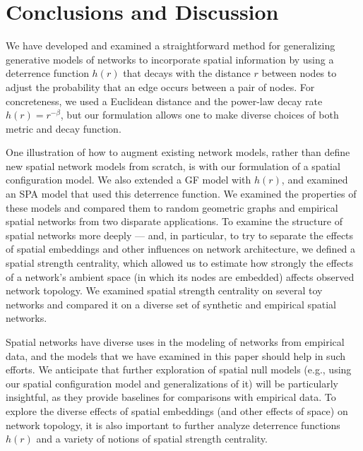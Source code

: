 \documentclass[%
 reprint,
 amsmath,amssymb,
 aps,
]{revtex4-1}
\begin{document}


\section{Conclusions and Discussion} \label{sec:discussion}

We have developed and examined a straightforward method for generalizing generative models of networks to incorporate spatial information by using a deterrence function $h(r)$ that decays with the distance $r$ between nodes to adjust the probability that an edge occurs between a pair of nodes. For concreteness, we used a Euclidean distance and the power-law decay rate $h(r) = r^{-\beta}$, but our formulation allows one to make diverse choices of both metric and decay function. 


One illustration of how to augment existing network models, rather than define new spatial network models from scratch, is with our formulation of a spatial configuration model. We also extended a GF model with $h(r)$, and examined an SPA model that used this deterrence function. 
We examined the properties of these models and compared them to random geometric graphs and empirical spatial networks from two disparate applications. To examine the structure of spatial networks more deeply --- and, in particular, to try to separate the effects of spatial embeddings and other influences on network architecture, we defined a spatial strength centrality, which allowed us to estimate how strongly the effects of a network's ambient space (in which its nodes are embedded) affects observed network topology. We examined spatial strength centrality on several toy networks and 
compared it on a diverse set of synthetic and empirical spatial networks.

Spatial networks have diverse uses in the modeling of networks from empirical data, and the models that we have examined in this paper should help in such efforts. We anticipate that further exploration of spatial null models (e.g., using our spatial configuration model and generalizations of it) will be particularly insightful, as they provide baselines for comparisons with empirical data. To explore the diverse effects of spatial embeddings (and other effects of space) on network topology, it is also important to further analyze deterrence functions $h(r)$ and a variety of notions of spatial strength centrality.
\end{document}
